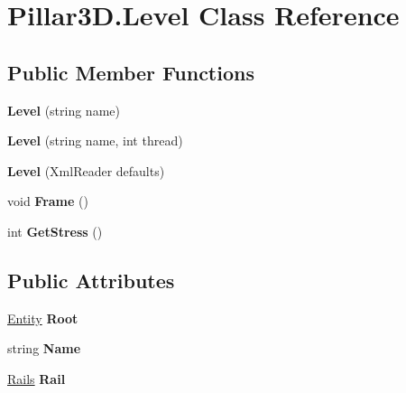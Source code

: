 \hypertarget{class_pillar3_d_1_1_level}{}\section{Pillar3\+D.\+Level Class Reference}
\label{class_pillar3_d_1_1_level}
\subsection*{Public Member Functions}
\begin{DoxyCompactItemize}
\item 
\mbox{\label{class_pillar3_d_1_1_level_acdb986304d922d1a7cd2f1c119ce6b8b}} 
{\bfseries Level} (string name)
\item 
\mbox{\label{class_pillar3_d_1_1_level_a0a70a720b583904cb057ced5ac94ed77}} 
{\bfseries Level} (string name, int thread)
\item 
\mbox{\label{class_pillar3_d_1_1_level_a8edca107e635454b6b069c31a795ab30}} 
{\bfseries Level} (Xml\+Reader defaults)
\item 
\mbox{\label{class_pillar3_d_1_1_level_a1a1cefe13861a4d3412c92c18d03e7f1}} 
void {\bfseries Frame} ()
\item 
\mbox{\label{class_pillar3_d_1_1_level_a66afd3c9ed001bfbe0f416f47665b045}} 
int {\bfseries Get\+Stress} ()
\end{DoxyCompactItemize}
\subsection*{Public Attributes}
\begin{DoxyCompactItemize}
\item 
\mbox{\label{class_pillar3_d_1_1_level_a931ebe02f1e1efab09139e3be3b860fa}} 
\hyperlink{class_pillar3_d_1_1_entity}{Entity} {\bfseries Root}
\item 
\mbox{\label{class_pillar3_d_1_1_level_a387ffc78f30fe32077aa04bb379f74f0}} 
string {\bfseries Name}
\item 
\mbox{\label{class_pillar3_d_1_1_level_a25a420f2a393d22c79a4acf62f278945}} 
\hyperlink{class_pillar3_d_1_1_rails}{Rails} {\bfseries Rail}
\end{DoxyCompactItemize}
